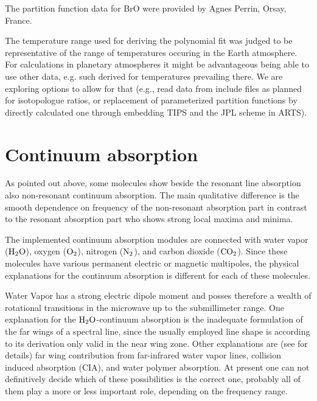 The partition function data for BrO were provided by Agnes
Perrin, Orsay, France.

The temperature range used for deriving the polynomial fit was judged to be
representative of the range of temperatures occuring in the Earth atmosphere.
For calculations in planetary atmospheres it might be advantageous being able to
use other data, e.g. such derived for temperatures prevailing there. We are
exploring options to allow for that (e.g., read data from include files as
planned for isotopologue ratios, or replacement of parameterized partition
functions by directly calculated one through embedding TIPS and the JPL scheme
in ARTS).


\section{Continuum absorption}
\label{sec:abs_theory:ContAbs}

As pointed out above, some molecules show beside the resonant line
absorption also non-resonant continuum absorption. The main qualitative
difference is the smooth dependence on frequency of the non-resonant
absorption part in contrast to the resonant absorption part who shows 
strong local maxima and minima.

The implemented continuum absorption modules are connected with water
vapor ($\mbox{H}_2\mbox{O}$), oxygen ($\mbox{O}_2$), nitrogen ($\mbox{N}_2$), and carbon dioxide
($\mbox{CO}_2$). Since these molecules have various permanent electric or magnetic
multipoles, the physical explanations for the continuum absorption is 
different for each of these molecules.

Water Vapor has a strong electric dipole moment and posses therefore a 
wealth of rotational transitions in the microwave up to the submillimeter 
range. One explanation for the $\mbox{H}_2\mbox{O}$-continuum absorption is the inadequate 
formulation of the far wings of a spectral line, since the usually employed 
\citet{vanvleck:45} line shape is according to its derivation only valid 
in the near wing zone. Other explanations are (see \citet{pwr:93} for details) 
far wing contribution from far-infrared water vapor lines, collision induced 
absorption (CIA), and water polymer absorption. At present one can not definitively 
decide which of these possibilities is the correct one, probably all of them 
play a more or less important role, depending on the frequency range.

